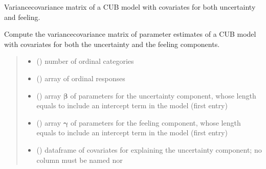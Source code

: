 \documentclass[letterpaper,10pt,english]{sphinxmanual}
\begin{document}
\begin{fulllineitems}
\label{\detokenize{cubmods:cubmods.cub_yw.varcov}}
\pysigstartsignatures
{}
\pysigstopsignatures
\sphinxAtStartPar
Variance\sphinxhyphen{}covariance matrix of a CUB model with covariates for both uncertainty and feeling.

\sphinxAtStartPar
Compute the variance\sphinxhyphen{}covariance matrix of parameter estimates of a CUB model with covariates for
both the uncertainty and the feeling components.
\begin{quote}\begin{description}
\begin{itemize}
\item {} 
\sphinxAtStartPar
{} () \textendash{} number of ordinal categories

\item {} 
\sphinxAtStartPar
{} () \textendash{} array of ordinal responses

\item {} 
\sphinxAtStartPar
{} () \textendash{} array \(\pmb \beta\) of parameters for the uncertainty component, whose length equals 
 to include an intercept term in the model (first entry)

\item {} 
\sphinxAtStartPar
{} () \textendash{} array \(\pmb \gamma\) of parameters for the feeling component, whose length equals 
 to include an intercept term in the model (first entry)

\item {} 
\sphinxAtStartPar
{} () \textendash{} dataframe of covariates for explaining the uncertainty component;
no column must be named  nor 


\end{itemize}
\end{description}
\end{quote}
\end{fulllineitems}
\end{document}
